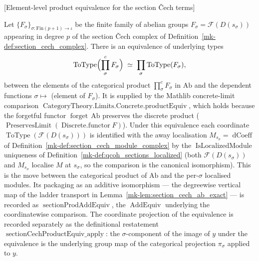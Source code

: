 \begin{lemma}

[Element-level product equivalence for the section {\v C}ech terms]
  \label{mk-lem:section_cech_product_equiv}

  Let \(\{F_\sigma\}_{\sigma : \mathrm{Fin}(p+1) \to \iota}\) be the finite family of
  abelian groups \(F_\sigma = \mathcal{F}(D(s_\sigma))\) appearing in degree \(p\) of
  the section {\v C}ech complex of Definition~\ref{mk-def:section_cech_complex}. There is
  an equivalence of underlying types
  \[
    \operatorname{ToType}\Bigl(\prod^{c}_{\sigma} F_\sigma\Bigr)
    \;\simeq\;
    \prod_{\sigma} \operatorname{ToType}(F_\sigma),
  \]
  between the elements of the categorical product \(\prod^{c}_{\sigma} F_\sigma\) in
  \(\mathrm{Ab}\) and the dependent functions \(\sigma \mapsto\) (element of
  \(F_\sigma\)). It is supplied by the Mathlib concrete-limit comparison
  \(\operatorname{CategoryTheory.Limits.Concrete.productEquiv}\), which holds because the
  forgetful functor \(\operatorname{forget}\,\mathrm{Ab}\) preserves the discrete
  product (\(\operatorname{PreservesLimit}(\operatorname{Discrete.functor} F)\)). Under
  this equivalence each coordinate
  \(\operatorname{ToType}(\mathcal{F}(D(s_\sigma)))\) is identified with the away
  localisation \(M_{s_\sigma} = \operatorname{dCoeff}\) of
  Definition~\ref{mk-def:section_cech_module_complex} by the
  \(\operatorname{IsLocalizedModule}\) uniqueness of
  Definition~\ref{mk-def:qcoh_sections_localized} (both
  \(\mathcal{F}(D(s_\sigma))\) and \(M_{s_\sigma}\) localise \(M\) at \(s_\sigma\), so
  the comparison is the canonical isomorphism). This is the move between the
  categorical product of \(\mathrm{Ab}\) and the per-\(\sigma\) localised modules.
  Its packaging as an additive isomorphism --- the degreewise vertical map of the
  ladder transport in Lemma~\ref{mk-lem:section_cech_ab_exact} --- is recorded as
  \(\operatorname{sectionProdAddEquiv}\), the \(\operatorname{AddEquiv}\) underlying
  the coordinatewise comparison.
  The coordinate projection of the equivalence is recorded separately as the
  definitional restatement
  \(\operatorname{sectionCechProductEquiv\_apply}\): the \(\sigma\)-component of the
  image of \(y\) under the equivalence is the underlying group map of the categorical
  projection \(\pi_\sigma\) applied to \(y\).
\end{lemma}

